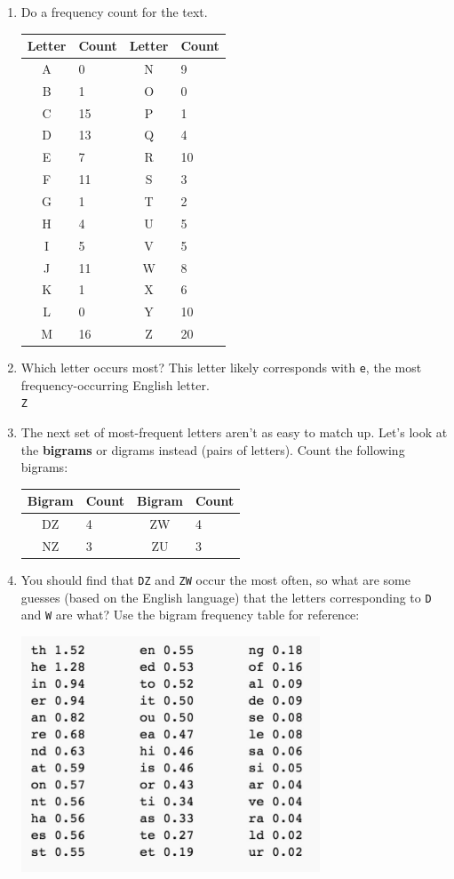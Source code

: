 \documentclass[12pt]{amsart}
\theoremstyle{plain}
\theoremstyle{definition}
\theoremstyle{remark}
\begin{document}
\begin{enumerate}[1.]
	\item Do a frequency count for the text.\\
	\begin{center}\begin{tabular}{|c|p{1in}||c|p{1in}|}\hline
	Letter & Count & Letter & Count\\\hline
	A&0&N&9\\
	B&1&O&0\\
	C&15&P&1\\
	D&13&Q&4\\
	E&7&R&10\\
	F&11&S&3\\
	G&1&T&2\\
	H&4&U&5\\
	I&5&V&5\\
	J&11&W&8\\
	K&1&X&6\\
	L&0&Y&10\\
	M&16&Z&20\\ \hline
	\end{tabular}\end{center}
	\item Which letter occurs most?  This letter likely corresponds with \texttt{e}, the most frequency-occurring English letter.\\ \texttt{Z}
	\item The next set of most-frequent letters aren't as easy to match up.  Let's look at the \textbf{bigrams} or digrams instead (pairs of letters).  Count the following bigrams:
	\begin{center}\begin{tabular}{|c|p{1in}||c|p{1in}|}\hline
	Bigram & Count & Bigram & Count\\\hline
	DZ&4&ZW&4\\
	NZ&3&ZU&3\\ \hline
	\end{tabular}\end{center}
	\item You should find that \texttt{DZ} and \texttt{ZW} occur the most often, so what are some guesses (based on the English language) that the letters corresponding to \texttt{D} and \texttt{W} are what?  Use the bigram frequency table for reference:
	\begin{center}
	\includegraphics[width=3.5in]{Bigram.jpg}\\

\end{center}
\end{enumerate}
\end{document}
